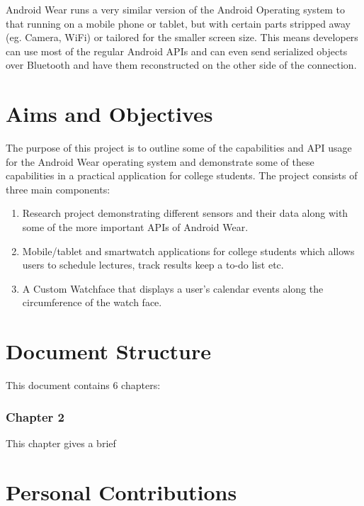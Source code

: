 Android Wear runs a very similar version of the Android Operating system to
that running on a mobile phone or tablet, but with certain parts stripped away
(eg. Camera, WiFi) or tailored for the smaller screen size. This means
developers can use most of the regular Android APIs and can even send
serialized objects over Bluetooth and have them reconstructed on the other side
of the connection.

\section{Aims and Objectives}

The purpose of this project is to outline some of the capabilities and API
usage for the Android Wear operating system and demonstrate some of these
capabilities in a practical application for college students. The project
consists of three main components:

\begin{enumerate}

\item Research project demonstrating different sensors and their data along
    with some of the more important APIs of Android Wear.
\item Mobile/tablet and smartwatch applications for college students which
    allows users to schedule lectures, track results keep a to-do list etc.
\item A Custom Watchface that displays a user's calendar events along the
    circumference of the watch face.

\end{enumerate}

\section{Document Structure}

This document contains 6 chapters:

\subsubsection{Chapter 2}
This chapter gives a brief 

\section{Personal Contributions}

